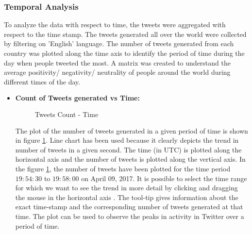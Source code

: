 \documentclass[9pt,twocolumn,twoside]{../../styles/osajnl}
\begin{document}
\subsubsection{Temporal Analysis}
To analyze the data with respect to time, the tweets were aggregated with respect to the time stamp. The tweets generated all over the world were collected by filtering on 'English' language. The number of tweets generated from each country was plotted along the time axis to identify the period of time during the day when people tweeted the most. A matrix was created to understand the average positivity/ negativity/ neutrality of people around the world during different times of the day. 
\begin{itemize}
    \item \textbf{Count of Tweets generated vs Time:}\\
    \begin{figure}[htbp]
    \centering
    \caption{Tweets Count - Time}
    \label{fig:tweetcnt}
    \end{figure}
    The plot of the number of tweets generated in a given period of time is shown in figure \ref{fig:tweetcnt}. Line chart has been used because it clearly depicts the trend in number of tweets in a given second. The time (in UTC) is plotted along the horizontal axis and the number of tweets is plotted along the vertical axis. In the figure \ref{fig:tweetcnt}, the number of tweets have been plotted for the time period $19:54:30$ to $19:58:00$ on April 09, 2017. It is possible to select the time range for which we want to see the trend in more detail by clicking and dragging the mouse in the horizontal axis \cite{www-HCMasterdetail}. The tool-tip gives information about the exact time-stamp and the corresponding number of tweets generated at that time. The plot can be used to observe the peaks in activity in Twitter over a period of time. 

\end{itemize}
\end{document}
